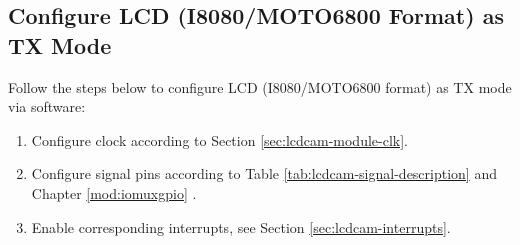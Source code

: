 \documentclass[main\_\_EN.tex]{subfiles}
\begin{document}
\subsection{Configure LCD (I8080/MOTO6800 Format) as TX Mode}

Follow the steps below to configure LCD (I8080/MOTO6800 format) as TX mode via software:

\begin{enumerate}
    \item Configure clock according to Section \ref{sec:lcdcam-module-clk}.

    \item Configure signal pins according to Table \ref{tab:lcdcam-signal-description} and Chapter \ref{mod:iomuxgpio} \textit{}.

    \item Enable corresponding interrupts, see Section \ref{sec:lcdcam-interrupts}.


\end{enumerate}
\end{document}
